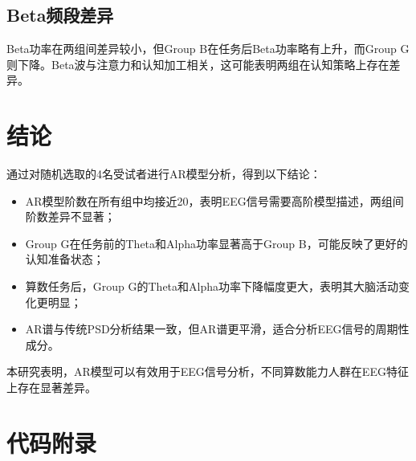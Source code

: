 \subsection{Beta频段差异}
Beta功率在两组间差异较小，但Group B在任务后Beta功率略有上升，而Group G则下降。Beta波与注意力和认知加工相关，这可能表明两组在认知策略上存在差异。

\section{结论}

通过对随机选取的4名受试者进行AR模型分析，得到以下结论：

\begin{itemize}
    \item AR模型阶数在所有组中均接近20，表明EEG信号需要高阶模型描述，两组间阶数差异不显著；
    \item Group G在任务前的Theta和Alpha功率显著高于Group B，可能反映了更好的认知准备状态；
    \item 算数任务后，Group G的Theta和Alpha功率下降幅度更大，表明其大脑活动变化更明显；
    \item AR谱与传统PSD分析结果一致，但AR谱更平滑，适合分析EEG信号的周期性成分。
\end{itemize}

本研究表明，AR模型可以有效用于EEG信号分析，不同算数能力人群在EEG特征上存在显著差异。

\section{代码附录}
